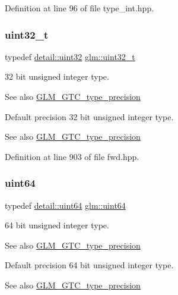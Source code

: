 Definition at line 96 of file type\+\_\+int.\+hpp.

\mbox{\label{group__gtc__type__precision_ga822ca53a9ad412504532838906276a99}} 
\subsubsection{\texorpdfstring{uint32\+\_\+t}{uint32\_t}}
{\footnotesize\ttfamily typedef \hyperlink{namespaceglm_1_1detail_ade6cfbf377022aaa391af8cd50489222}{detail\+::uint32} \hyperlink{group__gtc__type__precision_ga822ca53a9ad412504532838906276a99}{glm\+::uint32\+\_\+t}}

32 bit unsigned integer type. \begin{DoxySeeAlso}{See also}
\hyperlink{group__gtc__type__precision}{G\+L\+M\+\_\+\+G\+T\+C\+\_\+type\+\_\+precision}
\end{DoxySeeAlso}
Default precision 32 bit unsigned integer type. \begin{DoxySeeAlso}{See also}
\hyperlink{group__gtc__type__precision}{G\+L\+M\+\_\+\+G\+T\+C\+\_\+type\+\_\+precision} 
\end{DoxySeeAlso}


Definition at line 903 of file fwd.\+hpp.

\mbox{\label{group__gtc__type__precision_gae3632bf9b37da66233d78930dd06378a}} 
\subsubsection{\texorpdfstring{uint64}{uint64}}
{\footnotesize\ttfamily typedef \hyperlink{namespaceglm_1_1detail_adec4b19bf4982125e122db2fe03c5810}{detail\+::uint64} \hyperlink{group__gtc__type__precision_gae3632bf9b37da66233d78930dd06378a}{glm\+::uint64}}

64 bit unsigned integer type. \begin{DoxySeeAlso}{See also}
\hyperlink{group__gtc__type__precision}{G\+L\+M\+\_\+\+G\+T\+C\+\_\+type\+\_\+precision}
\end{DoxySeeAlso}
Default precision 64 bit unsigned integer type. \begin{DoxySeeAlso}{See also}
\hyperlink{group__gtc__type__precision}{G\+L\+M\+\_\+\+G\+T\+C\+\_\+type\+\_\+precision} 
\end{DoxySeeAlso}


